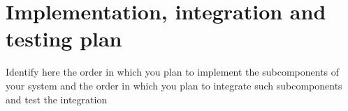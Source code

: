 \section{Implementation, integration and testing plan}
Identify here the order in which you plan
to implement the subcomponents of your system and the order in which you plan to integrate
such subcomponents and test the integration